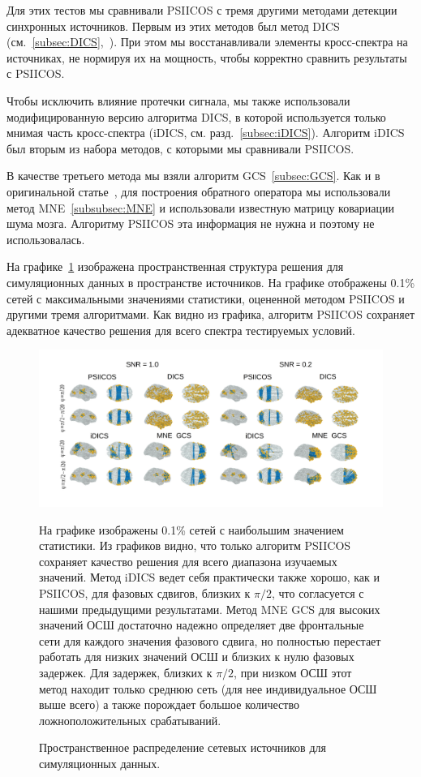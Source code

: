 Для этих тестов мы сравнивали PSIICOS с тремя другими методами детекции
синхронных источников. Первым из этих методов был метод DICS
(см.~\ref{subsec:DICS},~\cite{Gross2001}).  При этом мы восстанавливали
элементы кросс-спектра на источниках, не нормируя их на мощность, чтобы
корректно сравнить результаты с PSIICOS.\@

Чтобы исключить влияние протечки сигнала, мы также использовали
модифицированную версию алгоритма DICS, в которой используется только мнимая
часть кросс-спектра (iDICS, см. разд.~\ref{subsec:iDICS}). Алгоритм iDICS был
вторым из набора методов, с которыми мы сравнивали PSIICOS.\@

В качестве третьего метода мы взяли алгоритм GCS~\ref{subsec:GCS}.  Как и в
оригинальной статье~\cite{Wens2015}, для построения обратного оператора мы
использовали метод MNE~\ref{subsubsec:MNE} и использовали известную матрицу
ковариации шума мозга. Алгоритму PSIICOS эта информация не нужна и поэтому не
использовалась.

На графике~\ref{fig:05} изображена пространственная структура решения для
симуляционных данных в пространстве источников. На графике отображены 0.1\% сетей
с максимальными значениями статистики, оцененной методом PSIICOS и другими тремя
алгоритмами. Как видно из графика, алгоритм PSIICOS сохраняет адекватное качество решения
для всего спектра тестируемых условий.

\begin{figure}[!ht]
 \includegraphics[width=1\textwidth]{../images/psiicos_paper/Figure5_hr.jpg}
 \caption{Пространственное распределение сетевых источников для симуляционных данных.}\label{fig:05} %
     На графике изображены 0.1\% сетей с наибольшим значением
     статистики. Из графиков видно, что только алгоритм PSIICOS сохраняет
     качество решения для всего диапазона изучаемых значений.
     Метод iDICS ведет себя практически также хорошо, как и PSIICOS,
     для фазовых сдвигов, близких к $\pi/2$, что согласуется с нашими предыдущими
     результатами. Метод MNE GCS для высоких значений ОСШ достаточно надежно определяет
     две фронтальные сети для каждого значения фазового сдвига, но полностью перестает
     работать для низких значений ОСШ и близких к нулю фазовых задержек. Для задержек,
     близких к $\pi/2$, при низком ОСШ этот метод находит только среднюю сеть
     (для нее индивидуальное ОСШ выше всего) а также порождает большое количество
     ложноположительных срабатываний.
\end{figure}%

